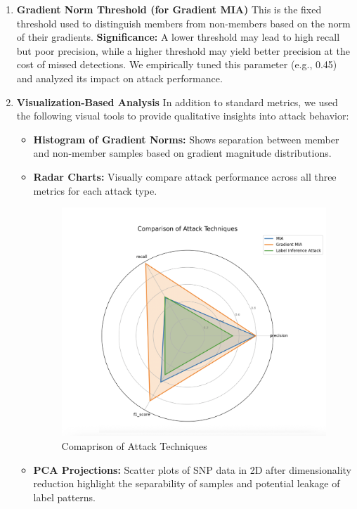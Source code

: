 \documentclass[conference]{IEEEtran}
\begin{document}
\begin{enumerate}
    \item \textbf{Gradient Norm Threshold (for Gradient MIA)}
    \newline
    This is the fixed threshold used to distinguish members from non-members based on the norm of their gradients.
    \textbf{Significance:} A lower threshold may lead to high recall but poor precision, while a higher threshold may yield better precision at the cost of missed detections. We empirically tuned this parameter (e.g., 0.45) and analyzed its impact on attack performance.
    \item \textbf{Visualization-Based Analysis}
    \newline
    In addition to standard metrics, we used the following visual tools to provide qualitative insights into attack behavior:
    \begin{itemize}
        \item \textbf{Histogram of Gradient Norms:} Shows separation between member and non-member samples based on gradient magnitude distributions.
        \item \textbf{Radar Charts:} Visually compare attack performance across all three metrics for each attack type.
\begin{figure}[H]
    \centering
    \includegraphics[width=\linewidth]{Radar_Chart.png}
    \caption{Comaprison of Attack Techniques}
\end{figure}
        \item \textbf{PCA Projections:} Scatter plots of SNP data in 2D after dimensionality reduction highlight the separability of samples and potential leakage of label patterns.

\end{itemize}
\end{enumerate}
\end{document}
